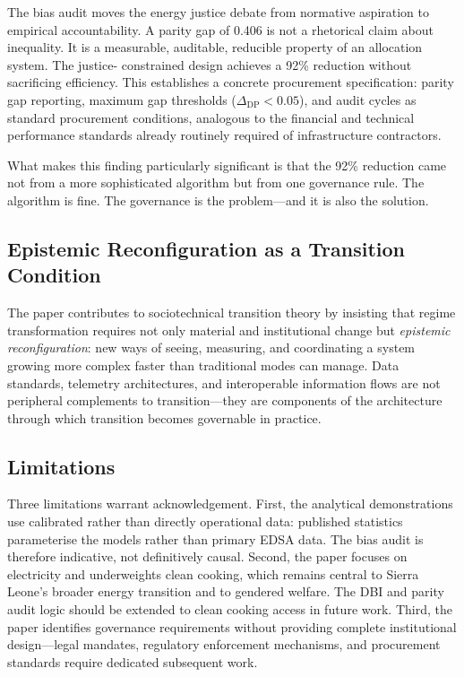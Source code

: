 \documentclass[preprint,12pt]{elsarticle}
\begin{document}
The bias audit moves the energy justice debate
\cite{Sovacool2015} from normative aspiration to empirical
accountability. A parity gap of 0.406 is not a rhetorical
claim about inequality. It is a measurable, auditable,
reducible property of an allocation system. The justice-
constrained design achieves a 92\% reduction without
sacrificing efficiency. This establishes a concrete
procurement specification: parity gap reporting, maximum
gap thresholds ($\Delta_{\mathrm{DP}} < 0.05$), and audit
cycles as standard procurement conditions, analogous to
the financial and technical performance standards already
routinely required of infrastructure contractors.

What makes this finding particularly significant is that
the 92\% reduction came not from a more sophisticated
algorithm but from one governance rule. The algorithm is
fine. The governance is the problem---and it is also the
solution.

\subsection{Epistemic Reconfiguration as a Transition
Condition}

The paper contributes to sociotechnical transition theory
\cite{Geels2002} by insisting that regime transformation
requires not only material and institutional change but
\textit{epistemic reconfiguration}: new ways of seeing,
measuring, and coordinating a system growing more complex
faster than traditional modes can manage. Data standards,
telemetry architectures, and interoperable information flows
are not peripheral complements to transition---they are
components of the architecture through which transition
becomes governable in practice.

\subsection{Limitations}

Three limitations warrant acknowledgement. First, the
analytical demonstrations use calibrated rather than
directly operational data: published statistics
parameterise the models rather than primary EDSA data.
The bias audit is therefore indicative, not definitively
causal. Second, the paper focuses on electricity and
underweights clean cooking, which remains central to
Sierra Leone's broader energy transition and to gendered
welfare. The DBI and parity audit logic should be extended
to clean cooking access in future work. Third, the paper
identifies governance requirements without providing
complete institutional design---legal mandates, regulatory
enforcement mechanisms, and procurement standards require
dedicated subsequent work.
\end{document}
